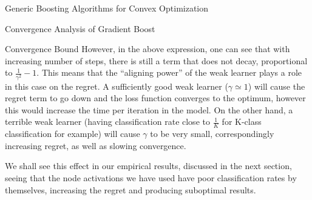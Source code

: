 \documentclass{article}
\begin{document}
\begin{psection}{Generic Boosting Algorithms for Convex Optimization}
\begin{psubsection}{Convergence Analysis of Gradient Boost}
\begin{pssubsection}{Convergence Bound}
			However, in the above expression, one can see that with increasing number of steps, there is still a term that does not decay, proportional to $\frac{1}{\gamma^2}-1$. This means that the ``aligning power'' of the weak learner plays a role in this case on the regret. A sufficiently good weak learner ($\gamma \simeq 1$) will cause the regret term to go down and the loss function converges to the optimum, however this would increase the time per iteration in the model. On the other hand, a terrible weak learner (having classification rate close to $\frac{1}{K}$ for K-class classification for example) will cause $\gamma$ to be very small, correspondingly increasing regret, as well as slowing convergence.

			We shall see this effect in our empirical results, discussed in the next section, seeing that the node activations we have used have poor classification rates by themselves, increasing the regret and producing suboptimal results.

		\end{pssubsection}
	\end{psubsection}

\end{psection}
\end{document}
